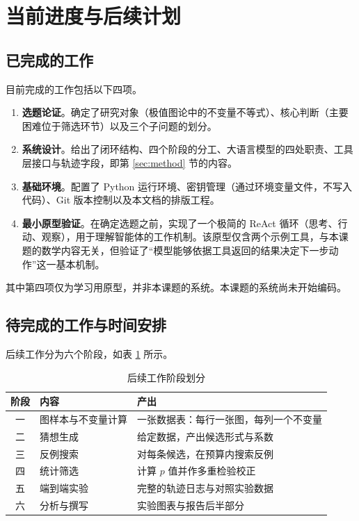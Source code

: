 
\section{当前进度与后续计划}
\label{sec:progress}

\subsection{已完成的工作}

目前完成的工作包括以下四项。

\begin{enumerate}
  \item \textbf{选题论证}。确定了研究对象（极值图论中的不变量不等式）、核心判断（主要困难位于筛选环节）以及三个子问题的划分。
  \item \textbf{系统设计}。给出了闭环结构、四个阶段的分工、大语言模型的四处职责、工具层接口与轨迹字段，即第 \ref{sec:method} 节的内容。
  \item \textbf{基础环境}。配置了 Python 运行环境、密钥管理（通过环境变量文件，不写入代码）、Git 版本控制以及本文档的排版工程。
  \item \textbf{最小原型验证}。在确定选题之前，实现了一个极简的 ReAct 循环（思考、行动、观察），用于理解智能体的工作机制。该原型仅含两个示例工具，与本课题的数学内容无关，但验证了“模型能够依据工具返回的结果决定下一步动作”这一基本机制。
\end{enumerate}

其中第四项仅为学习用原型，并非本课题的系统。本课题的系统尚未开始编码。

\subsection{待完成的工作与时间安排}

后续工作分为六个阶段，如表 \ref{tab:stages} 所示。

\begin{table}[H]
\centering
\small
\caption{后续工作阶段划分}
\label{tab:stages}
\begin{tabular}{@{}clp{7.0cm}@{}}
\toprule
阶段 & 内容 & 产出 \\
\midrule
一 & 图样本与不变量计算 & 一张数据表：每行一张图，每列一个不变量 \\
二 & 猜想生成 & 给定数据，产出候选形式与系数 \\
三 & 反例搜索 & 对每条候选，在预算内搜索反例 \\
四 & 统计筛选 & 计算 $p$ 值并作多重检验校正 \\
五 & 端到端实验 & 完整的轨迹日志与对照实验数据 \\
六 & 分析与撰写 & 实验图表与报告后半部分 \\
\bottomrule
\end{tabular}
\end{table}

